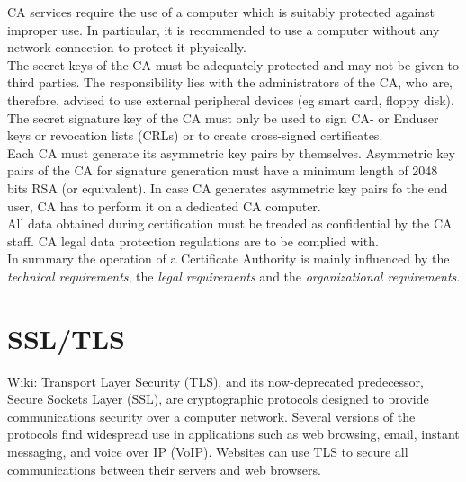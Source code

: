 \documentclass[11pt]{article}
\begin{document}
CA services require the use of a computer which is suitably protected against improper use. In particular, it is recommended to use a computer without any network connection to protect it physically.\\
The secret keys of the CA must be adequately protected and may not be given to third parties. The responsibility lies with the administrators of the CA, who are, therefore, advised to use external peripheral devices (eg smart card, floppy disk).\\
The secret signature key of the CA must only be used to sign CA- or Enduser keys or revocation lists (CRLs) or to create cross-signed certificates.\\
Each CA must generate its asymmetric key pairs by themselves. Asymmetric key pairs of the CA for signature generation must have a minimum length of 2048 bits RSA (or equivalent). In case CA generates asymmetric key pairs fo the end user, CA has to perform it on a dedicated CA computer.\\
All data obtained during certification must be treaded as confidential by the CA staff. CA legal data protection regulations are to be complied with.\\

In summary the operation of a Certificate Authority is mainly influenced by the \emph{technical requirements}, the \emph{legal requirements} and the \emph{organizational requirements}.
\section{SSL/TLS}
\label{sec:orgdce2239}
Wiki: Transport Layer Security (TLS), and its now-deprecated predecessor, Secure Sockets Layer (SSL), are cryptographic protocols designed to provide communications security over a computer network. Several versions of the protocols find widespread use in applications such as web browsing, email, instant messaging, and voice over IP (VoIP). Websites can use TLS to secure all communications between their servers and web browsers.
\end{document}
